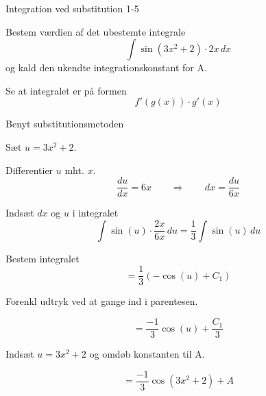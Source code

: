 \documentclass{article}
\begin{document}
\begin{exercise}{Integration ved substitution 1-5}
	
	
	Bestem værdien af det ubestemte integrale
	\[
	\int \sin(3x^2+2) \cdot 2x \, dx
	\]
	og kald den ukendte integrationskonstant for A.
	
	
	
	
	\hint
	
	Se at integralet er på formen
	\[
	f'(g(x)) \cdot g'(x)
	\]
	
	\hint
	
	Benyt substitutionsmetoden
	
	\hint
	
	Sæt $u=3x^2+2$.
	
	
	\hint
	
	Differentier $u$ mht. $x$.
	\[
	\frac{du}{dx} = 6x \qquad	\Rightarrow \qquad dx = \frac{du}{6x}
	\]
	
	\hint
	
	Indsæt $dx$ og $u$ i integralet
	\[
	\int \sin(u) \cdot \frac{2x}{6x} \, du = \frac{1}{3} \int \sin(u) \, du
	\]
	
	\hint
	
	Bestem integralet
	\[
	= \frac{1}{3} \left( -\cos(u) + C_1 \right)
	\]
	
	\hint
	Forenkl udtryk ved at gange ind i parentesen.
	
	\hint
	
	\[
	= \frac{-1}{3} \cos(u) + \frac{C_1}{3}
	\]
	
	\hint
	
	Indsæt $u = 3x^2+2$ og omdøb konstanten  til A.
	
	\hint
	
	\[
	= \frac{-1}{3} \cos(3x^2+2) + A
	\]
	
	
\end{exercise}

\newpage
\end{document}

